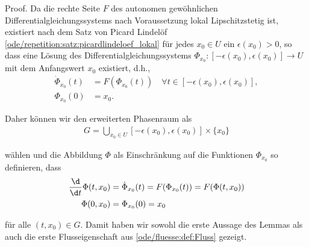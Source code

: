 \documentclass[letterpaper,10pt,english]{jupyterBook}
\begin{document}
\begin{emphBox}{}{}
\par
Proof. Da die rechte Seite \(F\) des autonomen gewöhnlichen Differentialgleichungssystems nach Voraussetzung lokal Lipschitzstetig ist, existiert nach dem Satz von Picard Lindelöf \cref{ode/repetition:satz:picardlindeloef_lokal} für jedes \(x_0\in U\) ein \(\epsilon(x_0)>0\), so dass eine Lösung des Differentialgleichungssystems \(\Phi_{x_0} \colon [-\epsilon(x_0),\epsilon(x_0)] \rightarrow U\) mit dem Anfangswert \(x_0\) existiert, d.h.,
\begin{align*}
\dot{\Phi}_{x_0}(t) &= F(\Phi_{x_0}(t)) \quad \forall t \in [-\epsilon(x_0),\epsilon(x_0)],\\
\Phi_{x_0}(0) &= x_0.
\end{align*}
\par
Daher können wir den erweiterten Phasenraum als
\begin{align*}
G = \bigcup_{x_0\in U} [-\epsilon(x_0),\epsilon(x_0)] \times\{x_0\}
\end{align*}
\par
wählen und die Abbildung \(\Phi\) als Einschränkung auf die Funktionen \(\Phi_{x_0}\) so definieren, dass
\begin{align*}
\frac{\d}{\d t} \Phi(t, x_0) &= \dot{\Phi}_{x_0}(t) = F(\Phi_{x_0}(t)) = F(\Phi(t, x_0))\\
\Phi(0, x_0) &= \Phi_{x_0}(0) = x_0
\end{align*}
\par
für alle \((t, x_0)\in G\).
Damit haben wir sowohl die erste Aussage des Lemmas als auch die erste Flusseigenschaft aus \cref{ode/fluesse:def:Fluss} gezeigt.


\end{emphBox}
\end{document}
